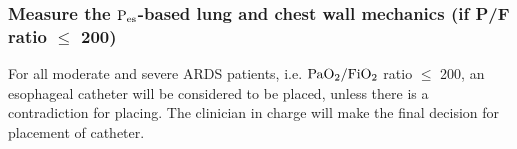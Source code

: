 \documentclass[11pt]{article} %
\def\Paw{$\rm{P_{aw}}$}
\def\Pes{$\rm{P_{es}}$}
\def\Ptp{$\rm{P_{tp}}$}
\def\Pplat{$\rm{P_{plat}}$}
\def\Ppeak{$\rm{P_{peak}}$}
\def\Ers{$\rm{E_{rs}}$}
\def\El{$\rm{E_{L}}$}
\begin{document}
\subsubsection{Measure the \Pes-based lung and chest wall mechanics (if P/F ratio $\leq$ 200)}
For all moderate and severe ARDS patients, i.e. $ \rm{PaO_2/FiO_2} $ ratio $\leq$ 200, an esophageal catheter will be considered to be placed, unless there is a contradiction for placing. The clinician in charge will make the final decision for placement of catheter. 
%
\end{document}

